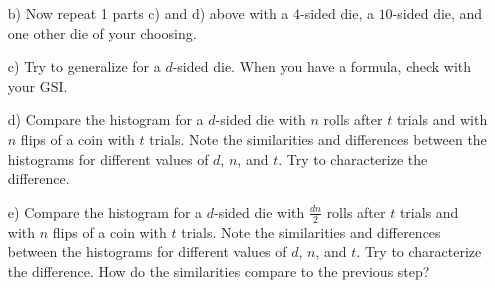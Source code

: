 \documentclass[11pt]{article}
\newif\ifsolutions
\begin{document}
\begin{enumerate}
\begin{enumerate}
\item[b)] Now repeat 1 parts c) and d) above with a $4$-sided die, a $10$-sided die, and one other die of your choosing.

\ifsolutions
{\color{blue}{Solution: Rolling $8$ times with $100$ trails, $4$-sided die gives the most common value of $2$ and $10$-sided die gives the most common value of $0$(or $1$). With $n$ rolls, a $4$-sided die will give the most common value of $n/4$ for the number of ``1''s rolled and a $10$-sided die gives $n/10$.}}

\begin{figure}
\centering
\texttt{[image: resources/dice\_4\_8\_1000.png]}
\caption{4-sided die, 8 rolls with 1000 trials.}
\end{figure}

\fi

\item[c)] Try to generalize for a $d$-sided die. When you have a formula, check with your GSI.

\ifsolutions
{\color{blue}{Solution: A $d$-sided die with $n$ rolls will give the most common value of $n/d$ for the number of ``1''s rolled.}}
\fi


\item[d)] Compare the histogram for a $d$-sided die with $n$ rolls after $t$ trials and with $n$ flips of a coin with $t$ trials. Note the similarities and differences between the histograms for different values of $d$, $n$, and $t$. Try to characterize the difference.

\ifsolutions
{\color{blue}{Suggested test values: $d=4,n=8,t=10,100$; Guide the students using the following facts: $mean=np$, $var=tnp(1-p)$ with coin of $p=1/2$ and die of $p=1/d$. So, the more sides of a die, the smaller most common value as well as less spread.}}
\fi


\item[e)] Compare the histogram for a $d$-sided die with $\frac{dn}{2}$ rolls after $t$ trials and with $n$ flips of a coin with $t$ trials. Note the similarities and differences between the histograms for different values of $d$, $n$, and $t$. Try to characterize the difference. How do the similarities compare to the previous step?

\ifsolutions
{\color{blue}{Similar suggested values as in iv.; similar guide as in iv. Here,
coin has $mean=n/2, var=tn/4$  and die has $mean=n/2, var=tn\frac{1}{2}(1-\frac{1}{d})$.
So, we will see similar most common value, but a smaller spread in die rolls.}}
\fi



\end{enumerate}
\end{enumerate}
\end{document}
